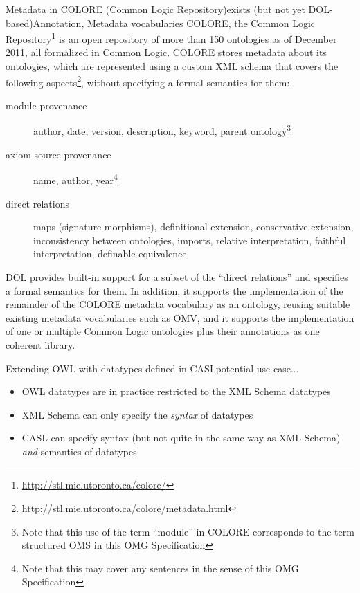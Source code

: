 \documentclass[10pt,fleqn,%
\ifpretendfinal
final%
\else
draft%
\fi,
]{scrreprt}
\newcommand*{\termref}[1]{\index{#1}#1\xspace}
\newcommand*{\IS}{OMG Specification\xspace}
\begin{document}
\begin{usecase}{Metadata in COLORE (Common Logic Repository)}{exists (but not yet DOL-based)}{Annotation, Metadata vocabularies}
  COLORE, the Common Logic Repository\footnote{\url{http://stl.mie.utoronto.ca/colore/}} is an open repository of more than 150 ontologies as of December 2011, all formalized in Common Logic.  COLORE stores metadata about its ontologies, which are represented using a custom XML schema that covers the following aspects\footnote{\url{http://stl.mie.utoronto.ca/colore/metadata.html}}, without specifying a formal semantics for them:
  \begin{description}
  \item[module provenance] author, date, version, description, keyword, parent ontology\footnote{Note that this use of the term ``module'' in COLORE corresponds
to the term \termref{structured OMS} in this \IS}
  \item[axiom source provenance] name, author, year\footnote{Note that this may cover any sentences in the sense of this \IS}
  \item[direct relations] maps (signature morphisms), definitional extension, conservative extension, inconsistency between ontologies, imports, relative interpretation, faithful interpretation, definable equivalence
  \end{description}

  DOL provides built-in support for a subset of the ``direct relations'' and specifies a formal semantics for them.  In addition, it supports the implementation of  the remainder of the COLORE metadata vocabulary as an ontology, reusing suitable existing metadata vocabularies such as OMV, and it supports the implementation of one or multiple Common Logic ontologies plus their annotations as one coherent library.
\end{usecase}

\begin{usecase}{Extending OWL with datatypes defined in CASL}{potential use case}{...}
  \begin{itemize}
  \item OWL datatypes are in practice restricted to the XML Schema datatypes
  \item XML Schema can only specify the \emph{syntax} of datatypes
  \item CASL can specify syntax (but not quite in the same way as XML Schema) \emph{and} semantics of datatypes
  \end{itemize}
\end{usecase}
\end{document}
